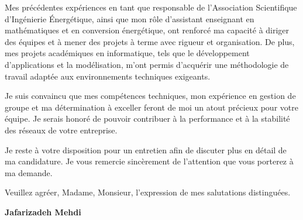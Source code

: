 \documentclass[11pt,a4paper]{letter}
\begin{document}
\vspace{0.3cm}

Mes précédentes expériences en tant que responsable de l'Association Scientifique d'Ingénierie Énergétique, ainsi que mon rôle d’assistant enseignant en mathématiques et en conversion énergétique, ont renforcé ma capacité à diriger des équipes et à mener des projets à terme avec rigueur et organisation. De plus, mes projets académiques en informatique, tels que le développement d'applications et la modélisation, m’ont permis d’acquérir une méthodologie de travail adaptée aux environnements techniques exigeants.

\vspace{0.3cm}

Je suis convaincu que mes compétences techniques, mon expérience en gestion de groupe et ma détermination à exceller feront de moi un atout précieux pour votre équipe. Je serais honoré de pouvoir contribuer à la performance et à la stabilité des réseaux de votre entreprise.

\vspace{0.3cm}

Je reste à votre disposition pour un entretien afin de discuter plus en détail de ma candidature. Je vous remercie sincèrement de l’attention que vous porterez à ma demande.
\vspace{0.3cm}



\vspace{0.5cm}

\noindent Veuillez agréer, Madame, Monsieur, l'expression de mes salutations distinguées.

\vspace{1cm}

\noindent\textbf{Jafarizadeh Mehdi}
\end{document}
